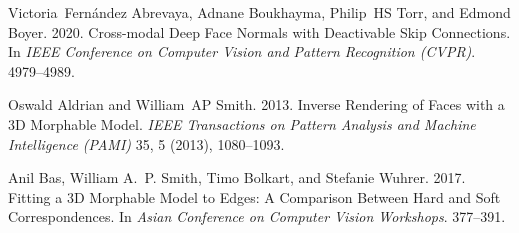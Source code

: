 

\begin{thebibliography}{108}



\ifx \showCODEN    \undefined {}     \fi
\ifx \showDOI      \undefined \def \showDOI       #1{#1}\fi
\ifx \showISBNx    \undefined \def \showISBNx     #1{\unskip}     \fi
\ifx \showISBNxiii \undefined \def \showISBNxiii  #1{\unskip}     \fi
\ifx \showISSN     \undefined \def \showISSN      #1{\unskip}     \fi
\ifx \showLCCN     \undefined \def \showLCCN      #1{\unskip}     \fi
\ifx \shownote     \undefined \def \shownote      #1{#1}          \fi
\ifx \showarticletitle \undefined \def \showarticletitle #1{#1}   \fi
\ifx \showURL      \undefined \def \showURL       {\relax}        \fi
\providecommand\bibfield[2]{#2}
\providecommand\bibinfo[2]{#2}
\providecommand\natexlab[1]{#1}
\providecommand\showeprint[2][]{arXiv:#2}

\bibfield{author}{\bibinfo{person}{Victoria~Fern{\'a}ndez Abrevaya},
  \bibinfo{person}{Adnane Boukhayma}, \bibinfo{person}{Philip~HS Torr}, {and}
  \bibinfo{person}{Edmond Boyer}.} \bibinfo{year}{2020}\natexlab{}.
\newblock \showarticletitle{Cross-modal Deep Face Normals with Deactivable Skip
  Connections}. In \bibinfo{booktitle}{\emph{IEEE Conference on Computer Vision
  and Pattern Recognition (CVPR)}}. \bibinfo{pages}{4979--4989}.
\newblock


\bibfield{author}{\bibinfo{person}{Oswald Aldrian} {and}
  \bibinfo{person}{William~AP Smith}.} \bibinfo{year}{2013}\natexlab{}.
\newblock \showarticletitle{Inverse Rendering of Faces with a {3D} Morphable
  Model}.
\newblock \bibinfo{journal}{\emph{IEEE Transactions on Pattern Analysis and
  Machine Intelligence (PAMI)}} \bibinfo{volume}{35}, \bibinfo{number}{5}
  (\bibinfo{year}{2013}), \bibinfo{pages}{1080--1093}.
\newblock


\bibfield{author}{\bibinfo{person}{Anil Bas}, \bibinfo{person}{William A.~P.
  Smith}, \bibinfo{person}{Timo Bolkart}, {and} \bibinfo{person}{Stefanie
  Wuhrer}.} \bibinfo{year}{2017}\natexlab{}.
\newblock \showarticletitle{Fitting a {3D} Morphable Model to Edges: A
  Comparison Between Hard and Soft Correspondences}. In
  \bibinfo{booktitle}{\emph{Asian Conference on Computer Vision Workshops}}.
  \bibinfo{pages}{377--391}.
\newblock



\end{thebibliography}
